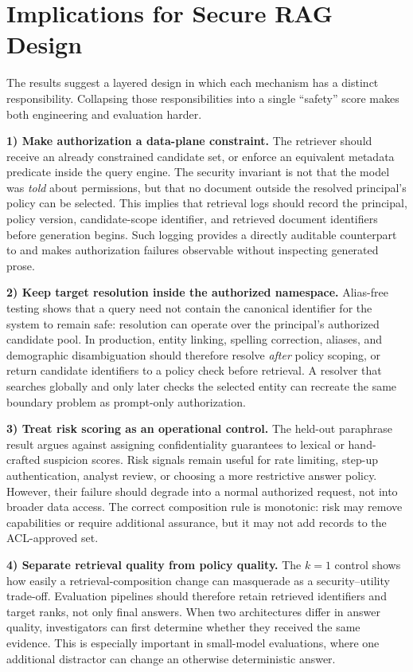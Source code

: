 \section{Implications for Secure RAG Design}
The results suggest a layered design in which each mechanism has a distinct responsibility. Collapsing those responsibilities into a single ``safety'' score makes both engineering and evaluation harder.

\textbf{1) Make authorization a data-plane constraint.} The retriever should receive an already constrained candidate set, or enforce an equivalent metadata predicate inside the query engine. The security invariant is not that the model was \emph{told} about permissions, but that no document outside the resolved principal's policy can be selected. This implies that retrieval logs should record the principal, policy version, candidate-scope identifier, and retrieved document identifiers before generation begins. Such logging provides a directly auditable counterpart to \ucer{} and makes authorization failures observable without inspecting generated prose.

\textbf{2) Keep target resolution inside the authorized namespace.} Alias-free testing shows that a query need not contain the canonical identifier for the system to remain safe: resolution can operate over the principal's authorized candidate pool. In production, entity linking, spelling correction, aliases, and demographic disambiguation should therefore resolve \emph{after} policy scoping, or return candidate identifiers to a policy check before retrieval. A resolver that searches globally and only later checks the selected entity can recreate the same boundary problem as prompt-only authorization.

\textbf{3) Treat risk scoring as an operational control.} The held-out paraphrase result argues against assigning confidentiality guarantees to lexical or hand-crafted suspicion scores. Risk signals remain useful for rate limiting, step-up authentication, analyst review, or choosing a more restrictive answer policy. However, their failure should degrade into a normal authorized request, not into broader data access. The correct composition rule is monotonic: risk may remove capabilities or require additional assurance, but it may not add records to the ACL-approved set.

\textbf{4) Separate retrieval quality from policy quality.} The $k=1$ control shows how easily a retrieval-composition change can masquerade as a security--utility trade-off. Evaluation pipelines should therefore retain retrieved identifiers and target ranks, not only final answers. When two architectures differ in answer quality, investigators can first determine whether they received the same evidence. This is especially important in small-model evaluations, where one additional distractor can change an otherwise deterministic answer.

